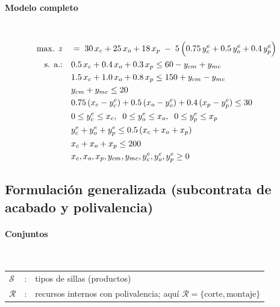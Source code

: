 \paragraph{Modelo completo}\mbox{}\\[2pt]
\begin{align}
\mbox{max. } z \quad &=\; 30\,x_c + 25\,x_o + 18\,x_p 
\;-\; 5\,\Big(0.75\,y_c^{e} + 0.5\,y_o^{e} + 0.4\,y_p^{e}\Big) \notag \\
\mbox{s. a.:} \quad 
& 0.5\,x_c + 0.4\,x_o + 0.3\,x_p \le 60 - y_{cm} + y_{mc} \notag \\
& 1.5\,x_c + 1.0\,x_o + 0.8\,x_p \le 150 + y_{cm} - y_{mc} \notag \\
& y_{cm} + y_{mc} \le 20 \notag \\
& 0.75\,(x_c - y_c^{e}) + 0.5\,(x_o - y_o^{e}) + 0.4\,(x_p - y_p^{e}) \le 30 \notag \\
& 0 \le y_c^{e} \le x_c,\;\; 0 \le y_o^{e} \le x_o,\;\; 0 \le y_p^{e} \le x_p \notag \\
& y_c^{e} + y_o^{e} + y_p^{e} \le 0.5\,(x_c + x_o + x_p) \notag \\
& x_c + x_o + x_p \le 200 \notag \\
& x_c, x_o, x_p, y_{cm}, y_{mc}, y_c^{e}, y_o^{e}, y_p^{e} \ge 0 \notag
\end{align}


\subsection{Formulación generalizada (subcontrata de acabado y polivalencia)}

\paragraph{Conjuntos}\mbox{}\\
\begin{tabular}{l c l}
    $\mathcal{S}$  & : & tipos de sillas (productos)\\
    $\mathcal{R}$  & : & recursos internos con polivalencia; aquí $\mathcal{R}=\{\text{corte},\text{montaje}\}$\\
\end{tabular}
\\
\\

